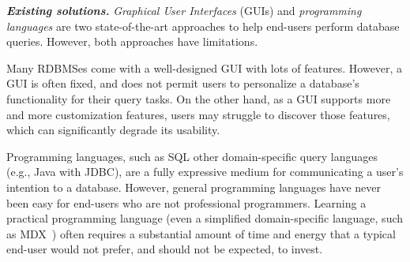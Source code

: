 








\vspace{1mm}
\noindent \textbf{\textit{Existing solutions.}}
\textit{Graphical User Interfaces} (GUIs) and \textit{programming languages}
are two state-of-the-art approaches to help end-users perform
database queries. However, both approaches have limitations.

Many RDBMSes come with a well-designed GUI with lots of features.
However, 
a GUI is often fixed, and does not permit users to personalize
a database's functionality for their query tasks. On the other hand,
as a GUI supports more and more customization features, users
may struggle to discover those features, which can significantly
degrade its usability. 

Programming languages, such as SQL
other domain-specific query languages (e.g., Java with JDBC), 
are a fully expressive medium  for
communicating a user's intention to a database. However, 
general programming languages have never been easy for
end-users who are not professional programmers.  Learning
a practical programming language (even a simplified domain-specific language, such as MDX~\cite{mdx}) often requires a substantial amount
of time and energy that a typical end-user would not prefer,
and should not be expected, to invest. 



